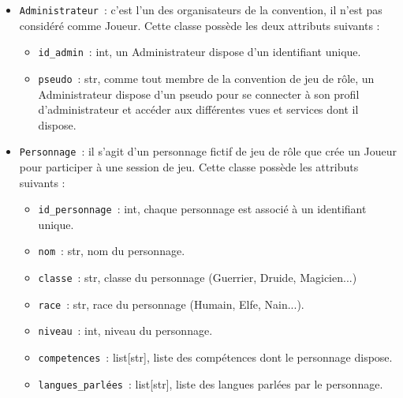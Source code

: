 \documentclass[11pt]{article}
\begin{document}
\bigbreak

\begin{itemize}
    \item \texttt{Administrateur}~: c'est l'un des organisateurs de la convention, il n’est pas considéré comme Joueur. Cette classe possède les deux attributs suivants :
    \begin{itemize}[label=, font=\small]
        \item \texttt{id\_admin}~: int, un Administrateur dispose d'un identifiant unique.
        \item \texttt{pseudo}~: str, comme tout membre de la convention de jeu de rôle, un Administrateur dispose d'un pseudo pour se connecter à son profil d'administrateur et accéder aux différentes vues et services dont il dispose.
    \end{itemize}
    
    \item \texttt{Personnage}~: il s'agit d'un personnage fictif de jeu de rôle que crée un Joueur pour participer à une session de jeu. Cette classe possède les attributs suivants :
    \begin{itemize}[label=, font=\small]
        \item \texttt{id\_personnage}~: int, chaque personnage est associé à un identifiant unique.
        \item \texttt{nom}~: str, nom du personnage.
        \item \texttt{classe}~: str, classe du personnage (Guerrier, Druide, Magicien...)
        \item \texttt{race}~: str, race du personnage (Humain, Elfe, Nain...).
        \item \texttt{niveau}~: int, niveau du personnage.
        \item \texttt{competences}~: list[str], liste des compétences dont le personnage dispose.
        \item \texttt{langues\_parlées}~: list[str], liste des langues parlées par le personnage.
    \end{itemize}


\end{itemize}
\end{document}
